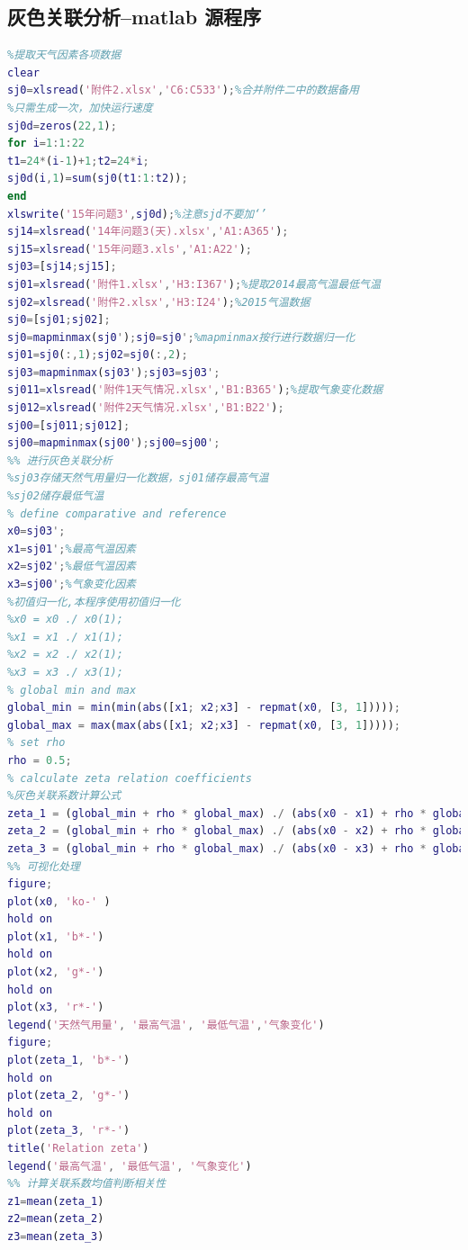 \documentclass{whutmod}
\begin{document}
\subsection{灰色关联分析--matlab 源程序}
\begin{lstlisting}[language=matlab]
%% 数据预处理
%提取天气因素各项数据
clear
sj0=xlsread('附件2.xlsx','C6:C533');%合并附件二中的数据备用
%只需生成一次，加快运行速度
sj0d=zeros(22,1);
for i=1:1:22
t1=24*(i-1)+1;t2=24*i;
sj0d(i,1)=sum(sj0(t1:1:t2));
end
xlswrite('15年问题3',sj0d);%注意sjd不要加‘’
sj14=xlsread('14年问题3(天).xlsx','A1:A365');
sj15=xlsread('15年问题3.xls','A1:A22');
sj03=[sj14;sj15];
sj01=xlsread('附件1.xlsx','H3:I367');%提取2014最高气温最低气温
sj02=xlsread('附件2.xlsx','H3:I24');%2015气温数据
sj0=[sj01;sj02];
sj0=mapminmax(sj0');sj0=sj0';%mapminmax按行进行数据归一化
sj01=sj0(:,1);sj02=sj0(:,2);
sj03=mapminmax(sj03');sj03=sj03';
sj011=xlsread('附件1天气情况.xlsx','B1:B365');%提取气象变化数据
sj012=xlsread('附件2天气情况.xlsx','B1:B22');
sj00=[sj011;sj012];
sj00=mapminmax(sj00');sj00=sj00';
%% 进行灰色关联分析
%sj03存储天然气用量归一化数据，sj01储存最高气温
%sj02储存最低气温
% define comparative and reference
x0=sj03';
x1=sj01';%最高气温因素
x2=sj02';%最低气温因素
x3=sj00';%气象变化因素
%初值归一化,本程序使用初值归一化
%x0 = x0 ./ x0(1);
%x1 = x1 ./ x1(1);
%x2 = x2 ./ x2(1);
%x3 = x3 ./ x3(1);
% global min and max
global_min = min(min(abs([x1; x2;x3] - repmat(x0, [3, 1]))));
global_max = max(max(abs([x1; x2;x3] - repmat(x0, [3, 1]))));
% set rho
rho = 0.5;
% calculate zeta relation coefficients
%灰色关联系数计算公式
zeta_1 = (global_min + rho * global_max) ./ (abs(x0 - x1) + rho * global_max);
zeta_2 = (global_min + rho * global_max) ./ (abs(x0 - x2) + rho * global_max);
zeta_3 = (global_min + rho * global_max) ./ (abs(x0 - x3) + rho * global_max);
%% 可视化处理
figure;
plot(x0, 'ko-' )
hold on
plot(x1, 'b*-')
hold on
plot(x2, 'g*-')
hold on
plot(x3, 'r*-')
legend('天然气用量', '最高气温', '最低气温','气象变化')
figure;
plot(zeta_1, 'b*-')
hold on
plot(zeta_2, 'g*-')
hold on
plot(zeta_3, 'r*-')
title('Relation zeta')
legend('最高气温', '最低气温', '气象变化')
%% 计算关联系数均值判断相关性
z1=mean(zeta_1)
z2=mean(zeta_2)
z3=mean(zeta_3)

\end{lstlisting}
\end{document}
